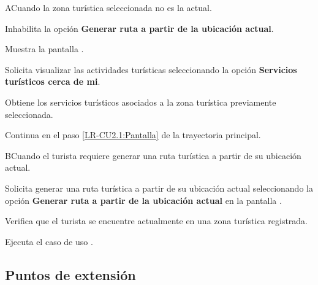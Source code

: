 		\begin{UCtrayectoriaA}{A}{Cuando la zona turística seleccionada no es la actual.}
			
			\UCpaso Inhabilita la opción \textbf{Generar ruta a partir de la ubicación actual}.
			
			\UCpaso Muestra la pantalla .
			
			\UCpaso [\UCactor] Solicita visualizar las actividades turísticas seleccionando la opción \textbf{Servicios turísticos cerca de mi}.
			
			\UCpaso Obtiene los servicios turísticos asociados a la zona turística previamente seleccionada.
			
			\UCpaso Continua en el paso \ref{LR-CU2.1:Pantalla} de la trayectoria principal.
		\end{UCtrayectoriaA}
	
	
	\begin{UCtrayectoriaA}{B}{Cuando el turista requiere generar una ruta turística a partir de su ubicación actual.}
		
		\UCpaso [\UCactor] Solicita generar una ruta turística a partir de su ubicación actual seleccionando la opción \textbf{Generar ruta a partir de la ubicación actual} en la pantalla .
		
		\UCpaso Verifica que el turista se encuentre actualmente en una zona turística registrada. 
		
		\UCpaso \label{LR-CU2.1:EjecutaCaso} Ejecuta el caso de uso .
		
	\end{UCtrayectoriaA}
	
	
	\subsection{Puntos de extensión}
	
